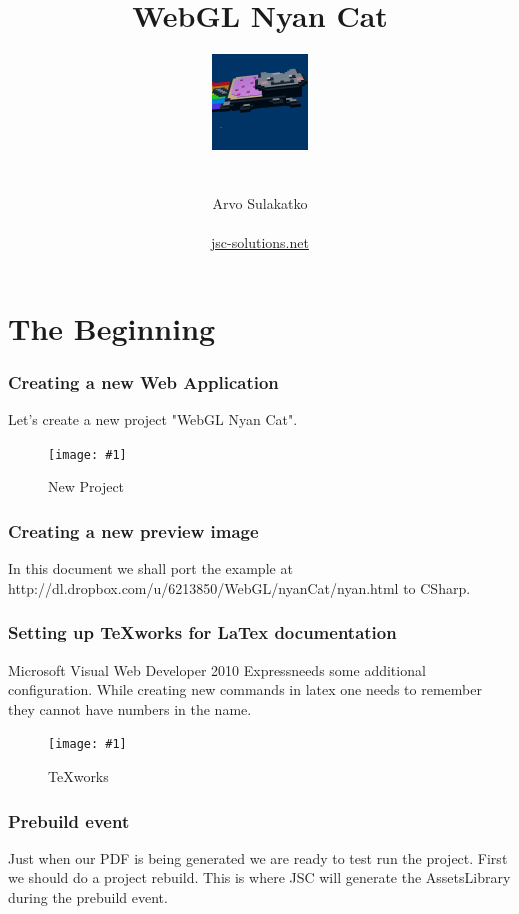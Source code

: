 \documentclass[12pt,leqno]{book}
\title{WebGL Nyan Cat}
\author{\includegraphics{../Design/Preview.png} \\ \\ \\ Arvo Sulakatko \\ \\ \href{http://www.jsc-solutions.net}{jsc-solutions.net} }
\newcommand{\webdev}{Microsoft Visual Web Developer 2010 Express}
\newcommand{\png}[1]{\texttt{[image: \#1]}}
\newcommand{\figpng}[2]{\begin{figure}[htb]\centering\png{#1}\caption{#2}\end{figure}}
\begin{document}
\maketitle



\tableofcontents
\listoffigures


\chapter{The Beginning}




\subsection{Creating a new Web Application}

Let's create a new project "WebGL Nyan Cat".

\figpng{Images/Add_New_Item_-_WebGLNyanCat-2012-03-31_12.14.47}
{New Project}




\subsection{Creating a new preview image}

In this document we shall  port the example at http://dl.dropbox.com/u/6213850/WebGL/nyanCat/nyan.html to CSharp.




\subsection{Setting up TeXworks for LaTex documentation}

\webdev needs some additional configuration. While creating new commands in latex one needs to remember they cannot have numbers in the name.

\figpng{Images/jsc-webgl-nyan-cat.pdf_-_TeXworks-2012-03-31_12.31.15}
{TeXworks}



\subsection{Prebuild event}
Just when our PDF is being generated we are ready to test run the project.
First we should do a project rebuild. This is where JSC will generate the AssetsLibrary during the prebuild event.
\end{document}
